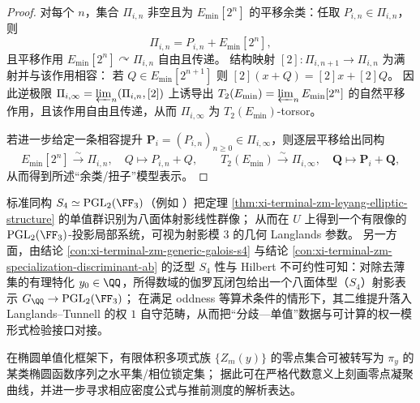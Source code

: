 \begin{proof}
对每个 \(n\)，集合 \(\Pi_{i,n}\) 非空且为 \(E_{\min}[2^n]\) 的平移余类：任取 \(P_{i,n}\in\Pi_{i,n}\)，则
\[
\Pi_{i,n}=P_{i,n}+E_{\min}[2^n],
\]
且平移作用 \(E_{\min}[2^n]\curvearrowright \Pi_{i,n}\) 自由且传递。
结构映射 \([2]:\Pi_{i,n+1}\to\Pi_{i,n}\) 为满射并与该作用相容：
若 \(Q\in E_{\min}[2^{n+1}]\) 则 \([2](x+Q)=[2]x+[2]Q\)。
因此逆极限 \(\Pi_{i,\infty}=\varprojlim_n(\Pi_{i,n},[2])\) 上诱导出 \(T_2(E_{\min})=\varprojlim_n E_{\min}[2^n]\) 的自然平移作用，且该作用自由且传递，从而 \(\Pi_{i,\infty}\) 为 \(T_2(E_{\min})\)-torsor。
\par
若进一步给定一条相容提升 \(\mathbf P_i=(P_{i,n})_{n\ge 0}\in\Pi_{i,\infty}\)，则逐层平移给出同构
\[
E_{\min}[2^n]\stackrel{\sim}{\to}\Pi_{i,n},\quad Q\mapsto P_{i,n}+Q,
\qquad
T_2(E_{\min})\stackrel{\sim}{\to}\Pi_{i,\infty},\quad \mathbf Q\mapsto \mathbf P_i+\mathbf Q,
\]
从而得到所述“余类/扭子”模型表示。
\end{proof}





\par


\begin{remark}\label{rem:xi-terminal-zm-octahedral-mod3-langlands}
标准同构 \(S_4\simeq \mathrm{PGL}_2(\FF_3)\)（例如 \cite{MITSmallGroupsPDF}）把定理 \ref{thm:xi-terminal-zm-leyang-elliptic-structure} 的单值群识别为八面体射影线性群像；
从而在 \(U\) 上得到一个有限像的 \(\mathrm{PGL}_2(\FF_3)\)-投影局部系统，可视为射影模 \(3\) 的几何 Langlands 参数。
另一方面，由结论 \ref{con:xi-terminal-zm-generic-galois-s4} 与结论 \ref{con:xi-terminal-zm-specialization-discriminant-ab} 的泛型 \(S_4\) 性与 Hilbert 不可约性可知：对除去薄集的有理特化 \(y_0\in\QQ\)，所得数域的伽罗瓦闭包给出一个八面体型（\(S_4\)）射影表示 \(G_\QQ\to \mathrm{PGL}_2(\FF_3)\)；
在满足 oddness 等算术条件的情形下，其二维提升落入 Langlands--Tunnell 的权 \(1\) 自守范畴，从而把“分歧—单值”数据与可计算的权一模形式检验接口对接。\cite{Tunnell1981OctahedralArtin,BuzzardPotentialModularitySurvey}
\end{remark}

\begin{remark}[零点凝聚层级的椭圆化入口]\label{rem:xi-terminal-zm-leyang-zero-measure-outlook}
在椭圆单值化框架下，有限体积多项式族 \(\{Z_m(y)\}\) 的零点集合可被转写为 \(\pi_y\) 的某类椭圆函数序列之水平集/相位锁定集；
据此可在严格代数意义上刻画零点凝聚曲线，并进一步寻求相应密度公式与推前测度的解析表达。
\end{remark}




